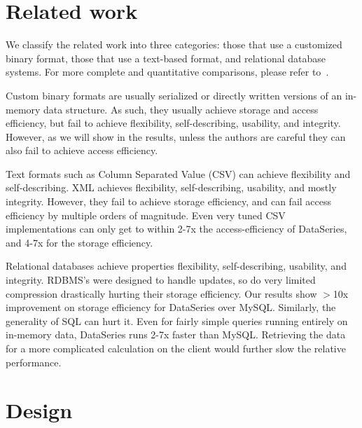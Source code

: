 \documentclass{acm_proc_article-sp}
\begin{document}
\section{Related work}\label{sec:related}

We classify the related work into three categories:
those that use a customized binary format, those that use a
text-based format, and relational database systems. 
For more complete and quantitative comparisons,
please refer to~\cite{DSTechnicalReportSnapshot}.

Custom binary formats are usually serialized or directly written
versions of an in-memory data structure.  As such, they usually
achieve storage 
and access efficiency, 
but fail to achieve
flexibility, self-describing, usability, and integrity.
However, as we
will show in the results, unless the authors are careful they can also
fail to achieve access efficiency.

Text formats such as Column Separated Value (CSV) can
achieve flexibility and self-describing. XML achieves flexibility,
self-describing, usability, and mostly integrity.  However, they fail
to achieve storage efficiency, and can fail access efficiency by
multiple orders of magnitude.  Even very tuned CSV implementations can
only get to within 2-7x the access-efficiency of DataSeries, and 4-7x
for the storage efficiency.

Relational databases achieve properties flexibility, self-describing,
usability, and integrity. RDBMS's were designed to handle updates, so
do very limited compression drastically hurting their storage
efficiency.  Our
results show $>$10x improvement on storage efficiency for DataSeries
over MySQL.
Similarly, the generality of SQL can hurt it.  Even for fairly simple
queries running entirely on in-memory data, DataSeries runs 2-7x
faster than MySQL. 
Retrieving the data for a more complicated
calculation on the client would further slow the relative performance.

\section{Design}\label{sec:design}
\end{document}
